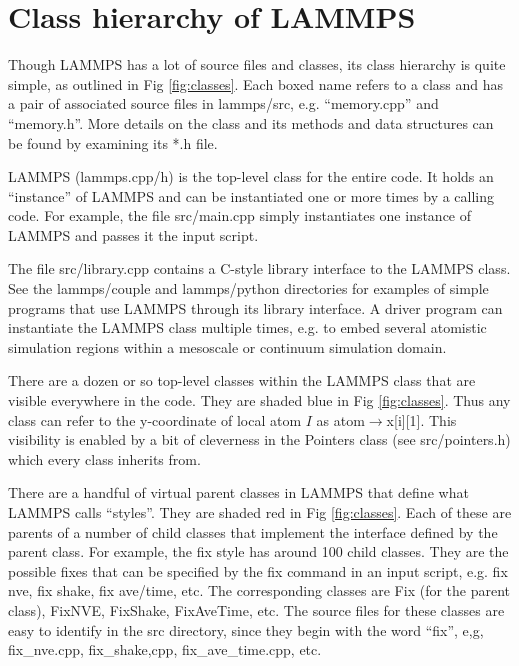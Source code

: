 \documentclass{article}
\begin{document}
\pagebreak
\section{Class hierarchy of LAMMPS}

Though LAMMPS has a lot of source files and classes, its class
hierarchy is quite simple, as outlined in Fig \ref{fig:classes}.  Each
boxed name refers to a class and has a pair of associated source files
in lammps/src, e.g. ``memory.cpp'' and ``memory.h''.  More details on the
class and its methods and data structures can be found by examining
its *.h file.

LAMMPS (lammps.cpp/h) is the top-level class for the entire code.  It
holds an ``instance'' of LAMMPS and can be instantiated one or more
times by a calling code.  For example, the file src/main.cpp simply
instantiates one instance of LAMMPS and passes it the input script.

The file src/library.cpp contains a C-style library interface to the
LAMMPS class.  See the lammps/couple and lammps/python directories for
examples of simple programs that use LAMMPS through its library
interface.  A driver program can instantiate the LAMMPS class multiple
times, e.g. to embed several atomistic simulation regions within a
mesoscale or continuum simulation domain.

There are a dozen or so top-level classes within the LAMMPS class that
are visible everywhere in the code.  They are shaded blue in Fig
\ref{fig:classes}.  Thus any class can refer to the y-coordinate of
local atom $I$ as atom$\rightarrow$x[i][1].  This visibility is
enabled by a bit of cleverness in the Pointers class (see
src/pointers.h) which every class inherits from.

There are a handful of virtual parent classes in LAMMPS that define
what LAMMPS calls ``styles''.  They are shaded red in Fig
\ref{fig:classes}.  Each of these are parents of a number of child
classes that implement the interface defined by the parent class.  For
example, the fix style has around 100 child classes.  They are the
possible fixes that can be specified by the fix command in an input
script, e.g. fix nve, fix shake, fix ave/time, etc.  The corresponding
classes are Fix (for the parent class), FixNVE, FixShake, FixAveTime,
etc.  The source files for these classes are easy to identify in the
src directory, since they begin with the word ``fix'', e,g,
fix\_nve.cpp, fix\_shake,cpp, fix\_ave\_time.cpp, etc.
\end{document}
